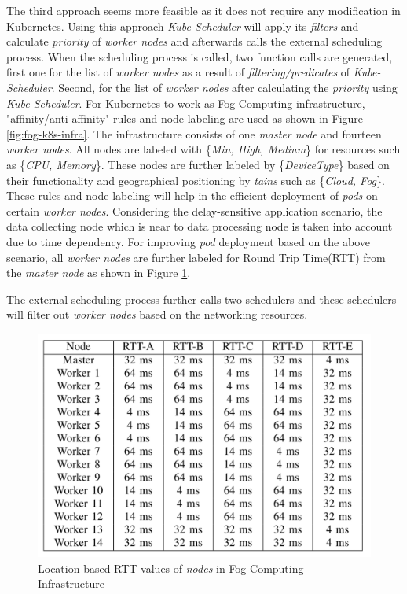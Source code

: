   The third approach seems more feasible as it does not require any modification in Kubernetes. Using this approach \emph{Kube-Scheduler} will apply its \emph{filters} and calculate \emph{priority} of \emph{worker nodes} and afterwards calls the external scheduling process\cite{Santos2019}. When the scheduling process is called, two function calls are generated\cite{Santos2019}, first one for the list of \emph{worker nodes} as a result of \emph{filtering/predicates} of \emph{Kube-Scheduler}\cite{Santos2019}. Second, for the list of \emph{worker nodes} after calculating the \emph{priority} using \emph{Kube-Scheduler}\cite{Santos2019}. For Kubernetes to work as Fog Computing infrastructure, "affinity/anti-affinity" rules and node labeling are used as shown in Figure \ref{fig:fog-k8s-infra}. The infrastructure consists of one \emph{master node} and fourteen \emph{worker nodes}. All nodes are labeled with \{\emph{Min, High, Medium}\} for resources such as \{\emph{CPU, Memory}\}\cite{Santos2019}. These nodes are further labeled by \{\emph{DeviceType}\} based on their functionality and geographical positioning by \emph{tains} such as \{\emph{Cloud, Fog}\}\cite{Santos2019}. These rules and node labeling will help in the efficient deployment of \emph{pods} on certain \emph{worker nodes}. Considering the delay-sensitive application scenario, the data collecting node which is near to data processing node is taken into account due to time dependency\cite{Santos2019}. For improving \emph{pod} deployment based on the above scenario, all \emph{worker nodes} are further labeled for Round Trip Time(RTT) from the \emph{master node}\cite{Santos2019} as shown in Figure \ref{fig:k8s-rtt}.\par
  The external scheduling process further calls two schedulers and these schedulers will filter out \emph{worker nodes} based on the networking resources.
  \begin{figure}
    \centering
    \includegraphics[width=\linewidth]{figures/mlcn-k8s-rtt.pdf}
    \caption{Location-based RTT values of \emph{nodes} in Fog Computing Infrastructure\cite{Santos2019}}
    \label{fig:k8s-rtt}
  \end{figure}
